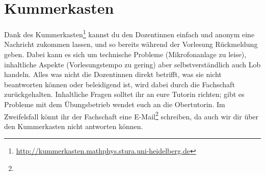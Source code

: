 \section{Kummerkasten}
\label{kummerkasten}

Dank des Kummerkasten\footnote{\url{http://kummerkasten.mathphys.stura.uni-heidelberg.de}} kannst du den Dozentinnen einfach und anonym eine Nachricht zukommen lassen, und so bereits während der Vorlesung Rückmeldung geben. Dabei kann es sich um technische Probleme (Mikrofonanlage zu leise), inhaltliche Aspekte (Vorlesungstempo zu gering) aber selbstverständlich auch Lob handeln. Alles was nicht die Dozentinnen direkt betrifft, was sie nicht beantworten können oder beleidigend ist, wird dabei durch die Fachschaft zurückgehalten. Inhaltliche Fragen solltet ihr an eure Tutorin richten; gibt es Probleme mit dem Übungsbetrieb wendet euch an die Obertutorin. Im Zweifelsfall könnt ihr der Fachschaft eine E-Mail\footnote{} schreiben, da auch wir dir über den Kummerkasten nicht antworten können.
